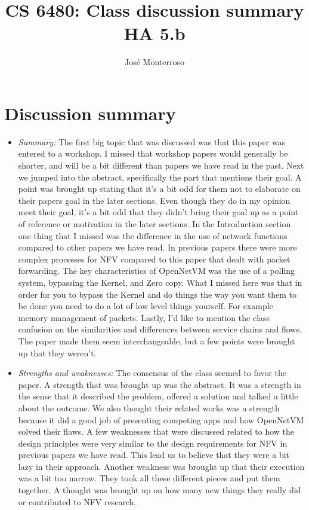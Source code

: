 \documentclass[letterpaper,twocolumn,10pt]{article}
\title{CS 6480: Class discussion summary\\
HA 5.b\\}
\author{José Monterroso}
\affil{School of Computing, University of Utah}
\begin{document}
\maketitle
\section*{Discussion summary}

\begin{itemize}

\item {\it Summary:}
The first big topic that was discussed was that this paper was entered to a workshop.
I missed that workshop papers would generally be shorter, and will be a bit different than
papers we have read in the past. Next we jumped into the abstract, specifically the part that mentions their 
goal. A point was brought up stating that it's a bit odd for them not to elaborate on their papers goal in the later
sections. Even though they do in my opinion meet their goal, it's a bit odd that they didn't bring their goal up as a point
of reference or motivation in the later sections. In the Introduction section one thing that I missed was the 
difference in the use of network functions compared to other papers we have read. In previous papers
there were more complex processes for NFV compared to this paper that dealt with packet forwarding. 
The key characteristics of OpenNetVM was the use of a polling
system, bypassing the Kernel, and Zero copy. What I missed here was that in order for you to bypass 
the Kernel and do things the way you want them to be done you need to do a lot of low level things yourself. For
example memory management of packets. Lastly, I'd like to mention the class confusion on the similarities
and differences between service chains and flows. The paper made them seem interchangeable, but a few
points were brought up that they weren't.

\item {\it Strengths and weaknesses:}  
The consensus of the class seemed to favor the paper. A strength 
that was brought up was the abstract. It was a strength in the sense that it described the problem, offered
a solution and talked a little about the outcome. We also thought their related works was a strength because
it did a good job of presenting competing apps and how OpenNetVM solved their flaws.  A few weaknesses that 
were discussed related to how the design principles were very similar to the design requirements for NFV 
in previous papers we have read. This lead us to believe that they were a bit lazy in their approach. 
Another weakness was brought up that their execution was a bit too narrow. They took all these different
pieces and put them together. A thought was brought up on how many new things they really did or
contributed to NFV research.


\end{itemize}
\end{document}
